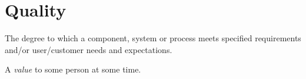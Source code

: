 \section{Quality}
\label{sec:Quality}

The degree to which a component, system or process meets specified requirements and/or user/customer needs and expectations.

A \emph{value} to some person at some time.
